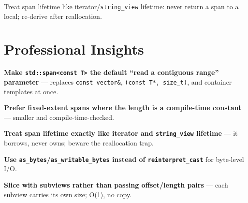 Treat span lifetime like iterator/\texttt{string\_view} lifetime: never return a span to a local; re-derive after reallocation.

\section{Professional Insights}
\label{sec:c20-span-insights}

\textbf{Make \texttt{std::span<const T>} the default ``read a contiguous range'' parameter} --- replaces \texttt{const vector\&}, \texttt{(const T*, size\_t)}, and container templates at once.

\textbf{Prefer fixed-extent spans where the length is a compile-time constant} --- smaller and compile-time-checked.

\textbf{Treat span lifetime exactly like iterator and \texttt{string\_view} lifetime} --- it borrows, never owns; beware the reallocation trap.

\textbf{Use \texttt{as\_bytes}/\texttt{as\_writable\_bytes} instead of \texttt{reinterpret\_cast}} for byte-level I/O.

\textbf{Slice with subviews rather than passing offset/length pairs} --- each subview carries its own size; O(1), no copy.
